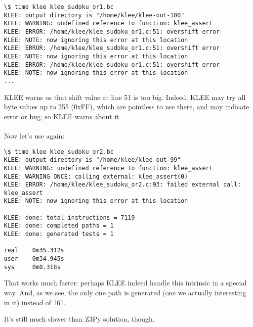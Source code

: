 \begin{lstlisting}
\$ time klee klee_sudoku_or1.bc
KLEE: output directory is "/home/klee/klee-out-100"
KLEE: WARNING: undefined reference to function: klee_assert
KLEE: ERROR: /home/klee/klee_sudoku_or1.c:51: overshift error
KLEE: NOTE: now ignoring this error at this location
KLEE: ERROR: /home/klee/klee_sudoku_or1.c:51: overshift error
KLEE: NOTE: now ignoring this error at this location
KLEE: ERROR: /home/klee/klee_sudoku_or1.c:51: overshift error
KLEE: NOTE: now ignoring this error at this location
...
\end{lstlisting}

KLEE warns us that shift value at line 51 is too big.
Indeed, KLEE may try all byte values up to 255 (0xFF), which are pointless to use there, and may indicate error or bug, so KLEE warns about it.\\
\\
Now let's use  again:



\begin{lstlisting}
\$ time klee klee_sudoku_or2.bc
KLEE: output directory is "/home/klee/klee-out-99"
KLEE: WARNING: undefined reference to function: klee_assert
KLEE: WARNING ONCE: calling external: klee_assert(0)
KLEE: ERROR: /home/klee/klee_sudoku_or2.c:93: failed external call: klee_assert
KLEE: NOTE: now ignoring this error at this location

KLEE: done: total instructions = 7119
KLEE: done: completed paths = 1
KLEE: done: generated tests = 1

real    0m35.312s
user    0m34.945s
sys     0m0.318s
\end{lstlisting}

That works much faster: perhaps KLEE indeed handle this intrinsic in a special way.
And, as we see, the only one path is generated (one we actually interesting in it) instead of 161.

It's still much slower than Z3Py solution, though.


